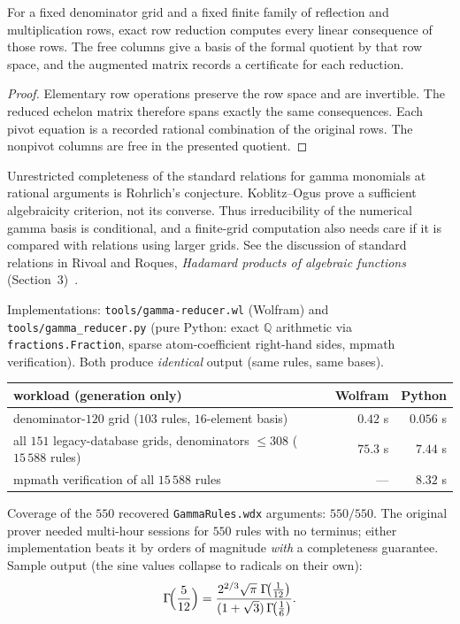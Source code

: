 \begin{proposition}\label{gamma:law:ko}
For a fixed denominator grid and a fixed finite family of reflection and
multiplication rows, exact row reduction computes every linear consequence
of those rows. The free columns give a basis of the formal quotient by that
row space, and the augmented matrix records a certificate for each reduction.
\end{proposition}
\begin{proof}
Elementary row operations preserve the row space and are invertible.
The reduced echelon matrix therefore spans exactly the same consequences.
Each pivot equation is a recorded rational combination of the original rows.
The nonpivot columns are free in the presented quotient.
\end{proof}
Unrestricted completeness of the standard relations for gamma monomials at
rational arguments is Rohrlich's conjecture. Koblitz--Ogus prove a
sufficient algebraicity criterion, not its converse. Thus irreducibility
of the numerical gamma basis is conditional, and a finite-grid computation
also needs care if it is compared with relations using larger grids.
See the discussion of standard relations in Rivoal and Roques,
\emph{Hadamard products of algebraic functions} (Section~3)~\cite{RivoalRoques}.

\begin{result}\label{gamma:res:bench}
Implementations: \texttt{tools/gamma-reducer.wl} (Wolfram) and
\texttt{tools/gamma\_reducer.py} (pure Python: exact $\mathbb{Q}$ arithmetic via
\texttt{fractions.Fraction}, sparse atom-coefficient right-hand sides, mpmath
verification). Both produce \emph{identical} output (same rules, same bases).

\begin{center}
\begin{tabular}{l r r}
\toprule
workload (generation only) & Wolfram & Python\\
\midrule
denominator-$120$ grid ($103$ rules, $16$-element basis) & $0.42$ s & $0.056$ s\\
all $151$ legacy-database grids, denominators $\le308$ ($15\,588$ rules) & $75.3$ s & $7.44$ s\\
mpmath verification of all $15\,588$ rules & --- & $8.32$ s\\
\bottomrule
\end{tabular}
\end{center}

Coverage of the $550$ recovered \texttt{GammaRules.wdx} arguments: $550/550$. The original
prover needed multi-hour sessions for $550$ rules with no terminus; either implementation
beats it by orders of magnitude \emph{with} a completeness guarantee. Sample output (the
sine values collapse to radicals on their own):
\[
\Gamma\!\Bigl(\frac{5}{12}\Bigr)
=\frac{2^{2/3}\sqrt{\pi}\;\Gamma\!\bigl(\tfrac1{12}\bigr)}
{(1+\sqrt3)\,\Gamma\!\bigl(\tfrac16\bigr)} .
\]
\end{result}

